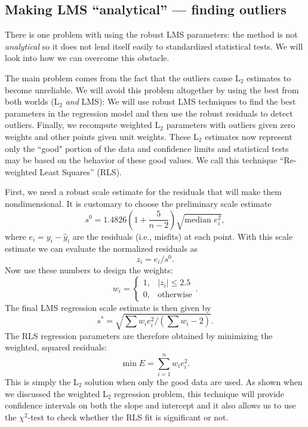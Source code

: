 
\subsection{Making LMS ``analytical'' --- finding outliers}

	There is one problem with using the robust LMS parameters: the method is not \emph{analytical} so it 
does not lend itself easily to standardized statistical tests.  We will look into how we can 
overcome this obstacle.
	
The main problem comes from the fact that the outliers cause L$_2$ estimates to become unreliable.  We 
will avoid this problem altogether by using the best from both worlds (L$_2$ \emph{and} LMS):  We will use robust 
LMS techniques to find the best parameters in the regression model and then use the robust residuals to 
detect outliers.  Finally, we recompute weighted L$_2$ parameters with outliers given 
zero weights and other points given unit weights.  These L$_2$ estimates now represent only the 
``good" portion of the data and confidence limits and statistical tests may be based on the 
behavior of these good values.  We call this technique ``Re-weighted Least Squares'' (RLS).

	First, we need a robust scale estimate for the residuals that will make them nondimensional.
It is customary to choose the preliminary scale estimate
\begin{equation}
s^0 =1.4826 \left( 1 + \frac{5}{n-2} \right ) \sqrt{\mbox{median } e^2_i},
\end{equation}	 	
where $e_i = y_i - \hat{y}_i$ are the residuals (i.e., misfits) at each point.
With this scale estimate we can evaluate the normalized residuals as
\begin{equation}
z_i = e_i/s^0.
\end{equation}	 
Now use these numbers to design the weights:
\begin{equation}
w_i = \left \{ \begin{array}{cl}
1, & |z_i| \leq 2.5\\
0, & \mbox{otherwise}
\end{array} \right. .
\end{equation}	 
The final LMS regression scale estimate is then given by
\begin{equation}
s^* = \sqrt{\displaystyle \sum w_i e^2_i / (\sum w_i -2)}.
\end{equation}	 	
The RLS regression parameters are therefore obtained by minimizing the weighted, squared residuals:
\begin{equation}
\min E = \sum^n_{i=1} w_i e^2_i.
\end{equation}	 	
This is simply the L$_2$ solution when only the good data are used.  As shown when we discussed 
the weighted L$_2$ regression problem, this technique will provide confidence intervals on both the 
slope and intercept and it also allows us to use the $\chi^2$-test to check whether the RLS fit is significant or not.
	
